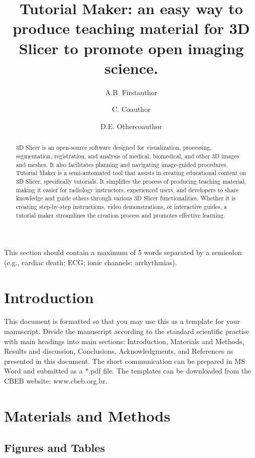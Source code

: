 \documentclass[nouppercase]{ifmbe}
\title{Tutorial Maker: an easy way to produce teaching material for 3D Slicer to promote open imaging science.}
\affiliation{Institution/Department, Affiliation, City, Country }{FIRSTAFF}
\affiliation{Institution/Department, Affiliation, City, Country }{SECONDAFF}
\author{A.B. Firstauthor}{FIRSTAFF}
\author{C. Coauthor}{SECONDAFF}
\author{D.E. Othercoauthor}{FIRSTAFF}
\begin{document}
\maketitle

\begin{abstract}
3D Slicer is an open-source software designed for visualization, processing, segmentation, registration, and analysis of medical, biomedical, and other 3D images and meshes. It also facilitates planning and navigating image-guided procedures. Tutorial Maker is a semi-automated tool that assists in creating educational content on 3D Slicer, specifically tutorials. It simplifies the process of producing teaching material, making it easier for radiology instructors, experienced users, and developers to share knowledge and guide others through various 3D Slicer functionalities. Whether it is creating step-by-step instructions, video demonstrations, or interactive guides, a tutorial maker streamlines the creation process and promotes effective learning.
\end{abstract}

\begin{keywords}
This section should contain a maximum of 5 words separated by a semicolon (e.g., cardiac death; ECG; ionic channels; arrhythmias).
\end{keywords}

\section{Introduction}

This document is formatted so that you may use this as a template for your manuscript. Divide the manuscript according to the standard scientific practise with main headings into main sections: Introduction, Materials and Methods, Results and discussion, Conclusions, Acknowledgments, and References as presented in this document. 
The short communication can be prepared in MS Word and submitted as a *.pdf file. The templates can be downloaded from the CBEB website: www.cbeb.org.br.


\section{Materials and Methods}

\subsection{Figures and Tables}
\end{document}
